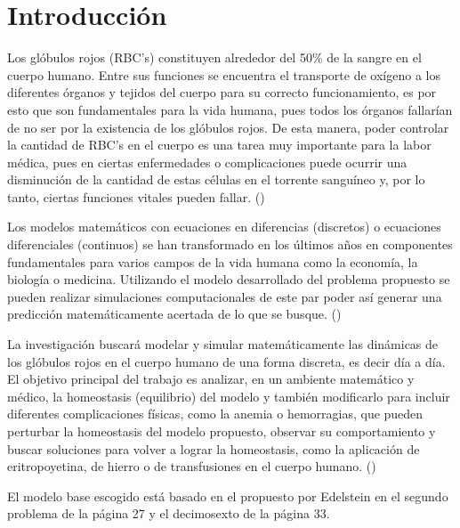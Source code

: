 \chapter{Introducción}\label{chap:intro}
Los glóbulos rojos (RBC's) constituyen alrededor del 50\% de la sangre en el cuerpo humano. Entre sus funciones se encuentra el transporte de oxígeno a los diferentes órganos y tejidos del cuerpo para su correcto funcionamiento, es por esto que son fundamentales para la vida humana, pues todos los órganos fallarían de no ser por la existencia de los glóbulos rojos. De esta manera, poder controlar la cantidad de RBC's en el cuerpo es una tarea muy importante para la labor médica, pues en ciertas enfermedades o complicaciones puede ocurrir una disminución de la cantidad de estas células en el torrente sanguíneo y, por lo tanto, ciertas funciones vitales pueden fallar. (\cite{cosgrove2021hematopoiesis}\cite{hall2021guyton}\cite{schippel2023dynamics}\cite{winter2014molecular}\cite{higgins2015red})

Los modelos matemáticos con ecuaciones en diferencias (discretos) o ecuaciones diferenciales (continuos) se han transformado en los últimos años en componentes fundamentales para varios campos de la vida humana como la economía, la biología o medicina. Utilizando el modelo desarrollado del problema propuesto se pueden realizar simulaciones computacionales de este par poder así generar una predicción matemáticamente acertada de lo que se busque. (\cite{edelstein1988mathematical}\cite{liu2023research}\cite{murray2007mathematical})

La investigación buscará modelar y simular matemáticamente las dinámicas de los glóbulos rojos en el cuerpo humano de una forma discreta, es decir día a día. El objetivo principal del trabajo es analizar, en un ambiente matemático y médico, la homeostasis (equilibrio) del modelo y también modificarlo para incluir diferentes complicaciones físicas, como la anemia o hemorragias, que pueden perturbar la homeostasis del modelo propuesto, observar su comportamiento y buscar soluciones para volver a lograr la homeostasis, como la aplicación de eritropoyetina, de hierro o de transfusiones en el cuerpo humano. (\cite{bunn2013erythropoietin}\cite{heras2023anemia}\cite{portoles2021anemia}\cite{shrestha2016models}\cite{kirk1968mathematical})

El modelo base escogido está basado en el propuesto por Edelstein \cite{edelstein1988mathematical} en el segundo problema de la página 27 y el decimosexto de la página 33.

